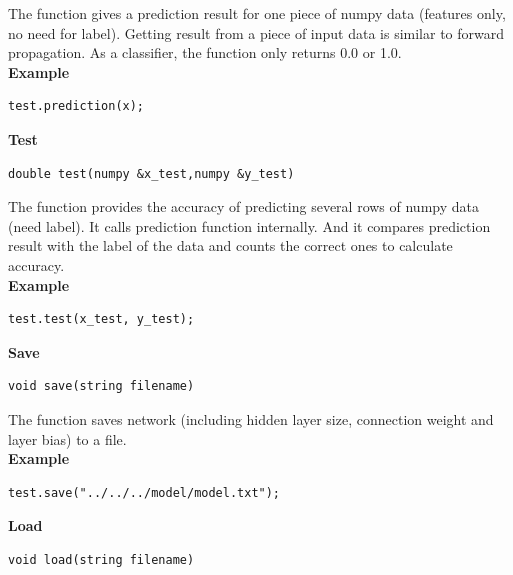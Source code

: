 \documentclass[a4paper]{article}
\begin{document}
The function gives a prediction result for one piece of numpy data (features only, no need for label). Getting result from a piece of input data is similar to forward propagation. As a classifier, the function only returns 0.0 or 1.0.\\
\textbf{Example}
\begin{lstlisting}[language={[ANSI]C++},keywordstyle=\color{blue!70},commentstyle=\color{red!50!green!50!blue!50},frame=shadowbox, rulesepcolor=\color{red!20!green!20!blue!20}]
test.prediction(x);
\end{lstlisting}
\textbf{\Large Test}
\begin{lstlisting}[language={[ANSI]C++},keywordstyle=\color{blue!70},commentstyle=\color{red!50!green!50!blue!50},frame=shadowbox, rulesepcolor=\color{red!20!green!20!blue!20}]
double test(numpy &x_test,numpy &y_test)
\end{lstlisting}

The function provides the accuracy of predicting several rows of numpy data (need label). It calls prediction function internally. And it compares prediction result with the label of the data and counts the correct ones to calculate accuracy. \\
\textbf{Example}
\begin{lstlisting}[language={[ANSI]C++},keywordstyle=\color{blue!70},commentstyle=\color{red!50!green!50!blue!50},frame=shadowbox, rulesepcolor=\color{red!20!green!20!blue!20}]
test.test(x_test, y_test);
\end{lstlisting}
\textbf{\Large Save}
\begin{lstlisting}[language={[ANSI]C++},keywordstyle=\color{blue!70},commentstyle=\color{red!50!green!50!blue!50},frame=shadowbox, rulesepcolor=\color{red!20!green!20!blue!20}]
void save(string filename)
\end{lstlisting}

The function saves network (including hidden layer size, connection weight and layer bias) to a file.\\
\textbf{Example}
\begin{lstlisting}[language={[ANSI]C++},keywordstyle=\color{blue!70},commentstyle=\color{red!50!green!50!blue!50},frame=shadowbox, rulesepcolor=\color{red!20!green!20!blue!20}]
test.save("../../../model/model.txt");
\end{lstlisting}
\textbf{\Large Load}
\begin{lstlisting}[language={[ANSI]C++},keywordstyle=\color{blue!70},commentstyle=\color{red!50!green!50!blue!50},frame=shadowbox, rulesepcolor=\color{red!20!green!20!blue!20}]
void load(string filename)
\end{lstlisting}
\end{document}
